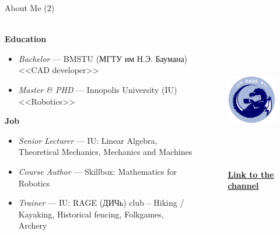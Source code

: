 \documentclass[aspectratio=169,notes]{beamer}
\begin{document}
\begin{frame}[t]{About Me (2)}
    \framesubtitle{}
    \begin{columns}[T,onlytextwidth]
        \begin{column}{0.69\textwidth}
            \textbf{Education}
            \begin{itemize}
                \item \textit{Bachelor} --- BMSTU (МГТУ им Н.Э. Баумана) <<CAD developer>>
                \item \textit{Master \& PHD} --- Innopolis University (IU) <<Robotics>>
            \end{itemize}
            \textbf{Job}
            \begin{itemize}
                \item \textit{Senior Lecturer} --- IU: Linear Algebra, Theoretical Mechanics, Mechanics and Machines
                \item \textit{Course Author} --- Skillbox: Mathematics for Robotics
                \item \textit{Trainer} --- IU: RAGE (ДИЧь) club -- Hiking / Kayaking, Historical fencing, Folkgames, Archery
            \end{itemize}
        \end{column}
        \begin{column}{0.29\textwidth}
            \begin{figure}[H]
                \centering\includegraphics[height=6cm,width=1\textwidth,keepaspectratio]{resources/image2.png}
                \caption*{\href{https://t.me/dich_trainings}{\textbf{Link to the channel}}}
                \label{fig:resources/image2.png}
            \end{figure}
        \end{column}
    \end{columns}
\end{frame}
\end{document}

